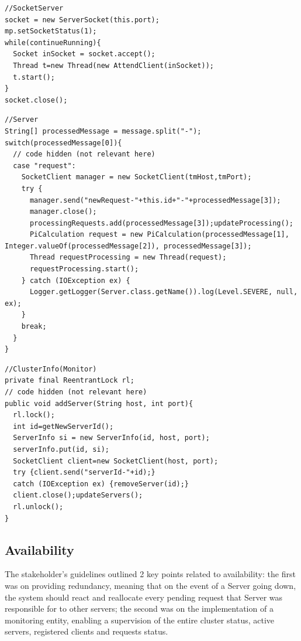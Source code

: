 \documentclass[12pt]{article}
\begin{document}
\begin{lstlisting}
//SocketServer
socket = new ServerSocket(this.port);
mp.setSocketStatus(1);
while(continueRunning){
  Socket inSocket = socket.accept();
  Thread t=new Thread(new AttendClient(inSocket));
  t.start();
}
socket.close();
\end{lstlisting}

\begin{lstlisting}
//Server
String[] processedMessage = message.split("-");
switch(processedMessage[0]){
  // code hidden (not relevant here)
  case "request":
    SocketClient manager = new SocketClient(tmHost,tmPort);
    try {
      manager.send("newRequest-"+this.id+"-"+processedMessage[3]);
      manager.close();
      processingRequests.add(processedMessage[3]);updateProcessing();
      PiCalculation request = new PiCalculation(processedMessage[1], Integer.valueOf(processedMessage[2]), processedMessage[3]);
      Thread requestProcessing = new Thread(request);
      requestProcessing.start();
    } catch (IOException ex) {
      Logger.getLogger(Server.class.getName()).log(Level.SEVERE, null, ex);
    }
    break;
  }
}
\end{lstlisting}

\begin{lstlisting}
//ClusterInfo(Monitor)
private final ReentrantLock rl;
// code hidden (not relevant here)
public void addServer(String host, int port){
  rl.lock();
  int id=getNewServerId();
  ServerInfo si = new ServerInfo(id, host, port);
  serverInfo.put(id, si);
  SocketClient client=new SocketClient(host, port);
  try {client.send("serverId-"+id);} 
  catch (IOException ex) {removeServer(id);}
  client.close();updateServers();
  rl.unlock();
}
\end{lstlisting}

\subsection{Availability} \label{availability}

The stakeholder's guidelines outlined 2 key points related to availability:
the first was on providing redundancy, meaning that on the event of a Server going down, the system should react and reallocate every pending request that Server
was responsible for to other servers;
the second was on the implementation of a monitoring entity, enabling a supervision of the entire cluster status, active servers, registered clients and requests status.
\end{document}

